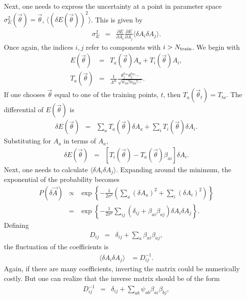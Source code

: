 \documentclass[UserManual.tex]{subfiles}
\begin{document}
Next, one needs to express the uncertainty at a point in parameter space $\sigma_E^2(\vec{\theta})=\vec{\theta}$, $\langle(\delta E(\vec{\theta}))^2\rangle$. This is given by 
\begin{eqnarray}
\sigma_E^2&=&\frac{\partial E}{\partial A_i}\frac{\partial E}{\partial A_j}\langle \delta A_i\delta A_j\rangle. 
\end{eqnarray}
Once again, the indices $i,j$ refer to components with $i>N_{\rm train}$. We begin with 
\begin{eqnarray}
E(\vec{\theta})&=&T_a(\vec{\theta})A_a+T_i(\vec{\theta})A_i,\\
\nonumber
T_a(\vec{\theta})&=&\frac{1}{\Lambda^K}\frac{\theta_1^{n_{1a}}\theta_2^{n_{2a}}\cdots}{\sqrt{n_{1a}!n_{2a}!\cdots}}.
\end{eqnarray}
If one chooses $\vec{\theta}$ equal to one of the training points, $t$, then $T_a(\vec{\theta}_t)=T_{ta}$. The differential of $E(\vec{\theta})$ is
\begin{eqnarray}
\delta E(\vec{\theta})&=&\sum_aT_a(\vec{\theta})\delta A_a+\sum_iT_i(\vec{\theta})\delta A_i.
\end{eqnarray}
Substituting for $A_a$ in terms of $A_a$, 
\begin{eqnarray}
\delta E(\vec{\theta})&=&\left[T_i(\vec{\theta})-T_a(\vec{\theta})\beta_{ai}\right]\delta A_i.
\end{eqnarray}
Next, one needs to calculate $\langle\delta A_i\delta A_j\rangle$. Expanding around the minimum, the exponential of the probability becomes
\begin{eqnarray}
P(\delta\vec{A})&\propto&
\exp\left\{
-\frac{1}{2\sigma^2}\left(\sum_a(\delta A_a)^2+\sum_i(\delta A_i)^2\right)
\right\}\\
\nonumber
&=&\exp\left\{
-\frac{1}{2\sigma^2}\sum_{ij}\left(\delta_{ij}+\beta_{ai}\beta_{aj}\right)\delta A_i\delta A_j
\right\}.
\end{eqnarray}
Defining
\begin{eqnarray}
D_{ij}&=&\delta_{ij}+\sum_a\beta_{ai}\beta_{aj},
\end{eqnarray}
the fluctuation of the coefficients is
\begin{eqnarray}
\langle\delta A_i\delta A_j\rangle&=D^{-1}_{ij}.
\end{eqnarray}
Again, if there are many coefficients, inverting the matrix could be numerically costly. But one can realize that the inverse matrix should be of the form
\begin{eqnarray}\label{eq:DinvDef}
D^{-1}_{ij}&=&\delta_{ij}+\sum_{ab}\psi_{ab}\beta_{ai}\beta_{bj},
\end{eqnarray}
\end{document}
